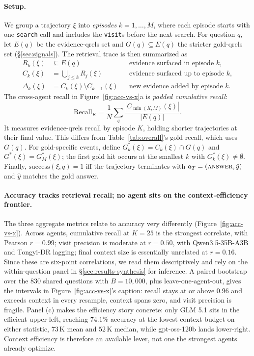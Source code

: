 \paragraph{Setup.} We group a trajectory $\xi$ into \emph{episodes} $k = 1,\dots,M$, where each episode starts with one \texttt{search} call and includes the \texttt{visit}s before the next search. For question $q$, let $E(q)$ be the evidence-qrels set and $G(q) \subseteq E(q)$ the stricter gold-qrels set (§\ref{sec:signals}). The retrieval trace is then summarized as
\begin{align*}
R_k(\xi) &\subseteq E(q) && \text{evidence surfaced in episode } k,\\
C_k(\xi) &= \bigcup_{j \le k} R_j(\xi) && \text{evidence surfaced up to episode } k,\\
\Delta_k(\xi) &= C_k(\xi) \setminus C_{k-1}(\xi) && \text{new evidence added by episode } k.
\end{align*}
The cross-agent recall in Figure~\ref{fig:acc-vs-x}a is \emph{padded cumulative recall}:
\[
\mathrm{Recall}_K = \frac{1}{N}\sum_q \frac{|C_{\min(K,M)}(\xi)|}{|E(q)|}.
\]
It measures evidence-qrels recall by episode $K$, holding shorter trajectories at their final value. This differs from Table~\ref{tab:overall}'s gold recall, which uses $G(q)$. For gold-specific events, define $G^*_k(\xi) = C_k(\xi) \cap G(q)$ and $G^*(\xi) = G^*_M(\xi)$; the first gold hit occurs at the smallest $k$ with $G^*_k(\xi) \neq \emptyset$. Finally, $\mathrm{success}(\xi,q)=1$ iff the trajectory terminates with $a_T=(\textsc{answer},\hat{y})$ and $\hat{y}$ matches the gold answer.

\paragraph{Accuracy tracks retrieval recall; no agent sits on the context-efficiency frontier.} The three aggregate metrics relate to accuracy very differently (Figure~\ref{fig:acc-vs-x}). Across agents, cumulative recall at $K = 25$ is the strongest correlate, with Pearson $r = 0.99$; visit precision is moderate at $r = 0.50$, with Qwen3.5-35B-A3B and Tongyi-DR lagging; final context size is essentially unrelated at $r = 0.16$. Since these are six-point correlations, we read them descriptively and rely on the within-question panel in §\ref{sec:results-synthesis} for inference. A paired bootstrap over the $830$ shared questions with $B = 10{,}000$, plus leave-one-agent-out, gives the intervals in Figure~\ref{fig:acc-vs-x}'s caption: recall stays at or above $0.96$ and exceeds context in every resample, context spans zero, and visit precision is fragile. Panel (c) makes the efficiency story concrete: only GLM 5.1 sits in the efficient upper-left, reaching $74.1\%$ accuracy at the lowest context budget on either statistic, $73\,$K mean and $52\,$K median, while gpt-oss-120b lands lower-right. Context efficiency is therefore an available lever, not one the strongest agents already optimize.

